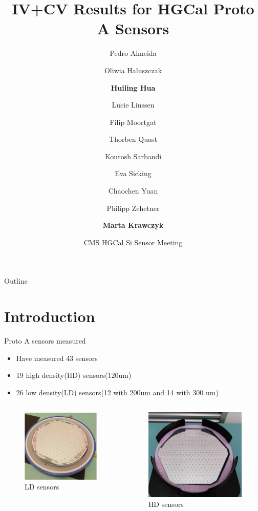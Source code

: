 \documentclass{beamer}
\title[Proto-A Sensors] %
{IV+CV Results for HGCal Proto A Sensors}
\author[Huiling Hua, Marta Krawczyk] %
{ Pedro Almeida\and Oliwia Haluszczak\and \textbf{Huiling Hua} \and Lucie Linssen\and Filip Moortgat\and Thorben Quast\and Kourosh Sarbandi\and Eva Sicking\and
Chaochen Yuan\and Philipp Zehetner\and \textbf{Marta Krawczyk} }
\date[29.03.2022] %
{CMS HGCal Si Sensor Meeting}
\begin{document}
\begin{frame}
  \titlepage
\end{frame}

\begin{frame}{Outline}
  \tableofcontents
\end{frame}
\section{Introduction}

\begin{frame}{Proto A sensors measured}
    \begin{itemize}
        \item Have measured \alert{43 sensors}
        \item 19 high density(HD) sensors(120um) 
        \item 26 low density(LD) sensors(12 with 200um and 14 with 300 um)
    \end{itemize}

    \begin{columns}
        \begin{figure}
            \includegraphics[width=.6\textwidth]{plots/LDsensors.png}
            \caption{LD sensors}
        \end{figure}
        \begin{figure}
            \includegraphics[width=.6\textwidth]{plots/HDsensors.png}
            \caption{HD sensors}
        \end{figure}
    \end{columns}

\end{frame}
\end{document}
